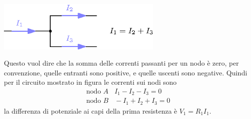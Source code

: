 \documentclass[10pt, letterpaper]{report}
\begin{document}
\begin{center}
    \includegraphics[width=0.6\textwidth]{images/Kirchhoff1.eps}
\end{center}
Questo vuol dire che la somma delle correnti passanti per un nodo è zero, per convenzione, quelle entranti sono positive, e quelle uscenti sono negative. Quindi per il circuito mostrato in figura le correnti sui nodi sono 
$$ \begin{matrix}
    \text{nodo }A \ \ \ \ I_1-I_2-I_3=0\\ 
    \text{nodo }B \ \ \ \ -I_1+I_2+I_3=0
\end{matrix}$$
la differenza di potenziale ai capi della prima resistenza è $V_1=R_1I_1$.
\end{document}
